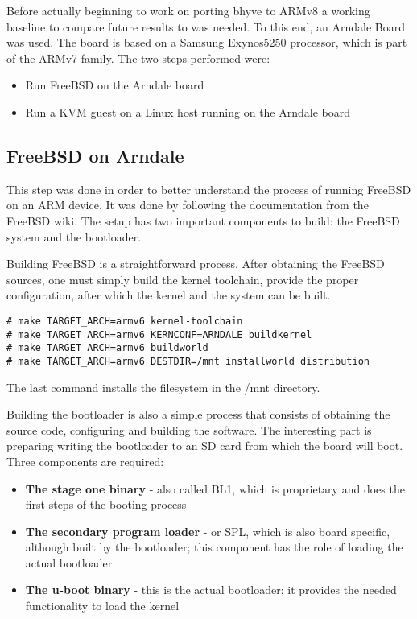 
Before actually beginning to work on porting bhyve to ARMv8 a working baseline to compare future results to was needed. To this end, an Arndale Board was used. The board is based on a Samsung Exynos5250 processor, which is part of the ARMv7 family.
The two steps performed were:
\begin{itemize}
\item
Run FreeBSD on the Arndale board
\item
Run a KVM guest on a Linux host running on the Arndale board
\end{itemize}

\subsection{FreeBSD on Arndale}
\label{subsec:bsd-arndale}

This step was done in order to better understand the process of running FreeBSD on an ARM device. It was done by following the documentation from the FreeBSD wiki\cite{arndale}.
The setup has two important components to build: the FreeBSD system and the bootloader.

Building FreeBSD is a straightforward process. After obtaining the FreeBSD sources, one must simply build the kernel toolchain, provide the proper configuration, after which the kernel and the system can be built.

\begin{lstlisting}[frame=bottom, basicstyle=\footnotesize\ttfamily]
# make TARGET_ARCH=armv6 kernel-toolchain
# make TARGET_ARCH=armv6 KERNCONF=ARNDALE buildkernel
# make TARGET_ARCH=armv6 buildworld
# make TARGET_ARCH=armv6 DESTDIR=/mnt installworld distribution
\end{lstlisting}

The last command installs the filesystem in the /mnt directory.

Building the bootloader is also a simple process that consists of obtaining the source code, configuring and building the software.
The interesting part is preparing writing the bootloader to an SD card from which the board will boot. Three components are required:
\begin{itemize}
\item
\textbf{The stage one binary} - also called BL1, which is proprietary and does the first steps of the booting process
\item
\textbf{The secondary program loader} - or SPL, which is also board specific, although built by the bootloader; this component has the role of loading the actual bootloader
\item
\textbf{The u-boot binary} - this is the actual bootloader; it provides the needed functionality to load the kernel
\end{itemize}

